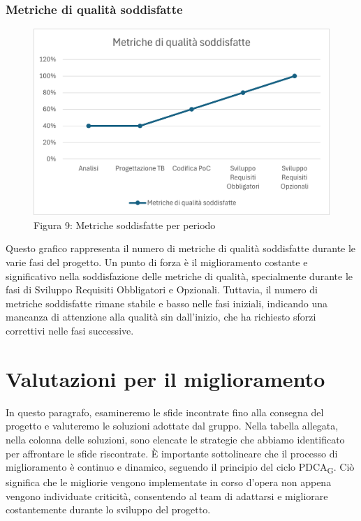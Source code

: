 \documentclass{article}
\begin{document}
\subsubsection{Metriche di qualità soddisfatte}
\begin{figure}[H]
    \centering
    \includegraphics{documenti/grafici/MetricheDiQualitaSoddisfattePB1.png}
    \caption{Figura 9: Metriche soddisfatte per periodo}
    \end{figure}
    Questo grafico rappresenta il numero di metriche di qualità soddisfatte durante le varie fasi del progetto. Un punto di forza è il miglioramento costante e significativo nella soddisfazione delle metriche di qualità, specialmente durante le fasi di Sviluppo Requisiti Obbligatori e Opzionali. Tuttavia, il numero di metriche soddisfatte rimane stabile e basso nelle fasi iniziali, indicando una mancanza di attenzione alla qualità sin dall'inizio, che ha richiesto sforzi correttivi nelle fasi successive.

\section{Valutazioni per il miglioramento}
In questo paragrafo, esamineremo le sfide incontrate fino alla consegna del progetto e valuteremo le soluzioni adottate dal gruppo. Nella tabella allegata, nella colonna delle soluzioni, sono elencate le strategie che abbiamo identificato per affrontare le sfide riscontrate. È importante sottolineare che il processo di miglioramento è continuo e dinamico, seguendo il principio del ciclo PDCA\textsubscript{G}. Ciò significa che le migliorie vengono implementate in corso d'opera non appena vengono individuate criticità, consentendo al team di adattarsi e migliorare costantemente durante lo sviluppo del progetto.
\end{document}
